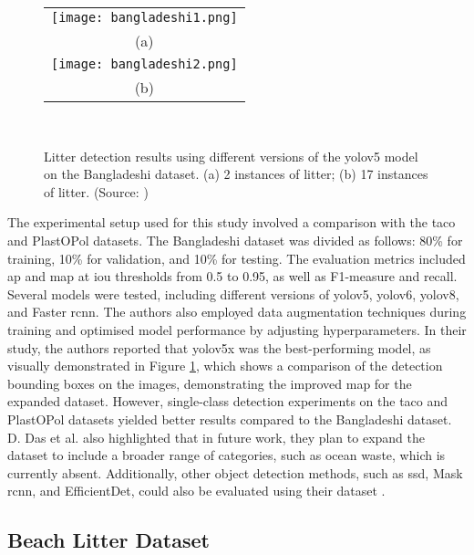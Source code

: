 \begin{figure}[!htbp]
  \centering
  \begin{tabular}{c}
    \texttt{[image: bangladeshi1.png]} \\
    \small (a)\\
    \texttt{[image: bangladeshi2.png]} \\
    \small (b) \\
  \end{tabular}\\
  \caption{Litter detection results using different versions of the \gls{yolo}v5 model on the Bangladeshi dataset. (a) 2 instances of litter; (b) 17 instances of litter. (Source: \cite{bangladeshi})}
  \label{fig:bangladeshi}
\end{figure}

The experimental setup used for this study involved a comparison with the \gls{taco} and PlastOPol datasets. The Bangladeshi dataset was divided as follows: 80\% for training, 10\% for validation, and 10\% for testing. The evaluation metrics included \gls{ap} and \gls{map} at \gls{iou} thresholds from 0.5 to 0.95, as well as F1-measure and recall. Several models were tested, including different versions of \gls{yolo}v5, \gls{yolo}v6, \gls{yolo}v8, and Faster \gls{rcnn}. The authors also employed data augmentation techniques during training and optimised model performance by adjusting hyperparameters.
In their study, the authors reported that \gls{yolo}v5x was the best-performing model, as visually demonstrated in Figure \ref{fig:bangladeshi}, which shows a comparison of the detection bounding boxes on the images, demonstrating the improved \gls{map} for the expanded dataset. However, single-class detection experiments on the \gls{taco} and PlastOPol datasets yielded better results compared to the Bangladeshi dataset. D. Das et al. also highlighted that in future work, they plan to expand the dataset to include a broader range of categories, such as ocean waste, which is currently absent. Additionally, other object detection methods, such as \gls{ssd}, Mask \gls{rcnn}, and EfficientDet, could also be evaluated using their dataset \cite{bangladeshi}.

\subsection{Beach Litter Dataset}
\label{subsec:3_beach_litter}

